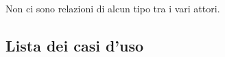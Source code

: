 Non ci sono relazioni di alcun tipo tra i vari attori.

\pagebreak
\subsection{Lista dei casi d'uso}








